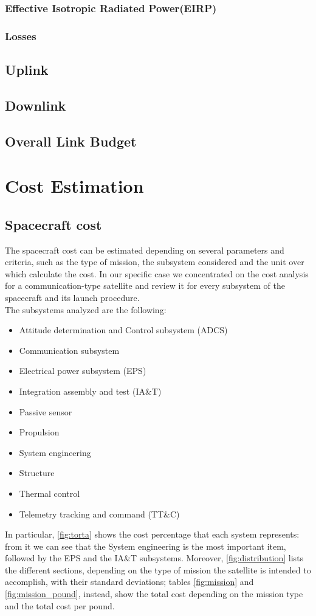 \documentclass[11pt,a4paper,titlepage]{article}
\begin{document}
		\subsubsection{Effective Isotropic Radiated Power(EIRP)}
		\subsubsection{Losses}
	\subsection{Uplink}
	\subsection{Downlink}
	\subsection{Overall Link Budget}
\lipsum[1]

\section{Cost Estimation}
	\subsection{Spacecraft cost}
		The spacecraft cost can be estimated depending on several parameters and criteria, such as the type of mission, the 				subsystem considered and the unit over which calculate the cost. In our specific case we concentrated on the cost analysis 		for a communication-type satellite and review it for every subsystem of the spacecraft and its launch procedure.\\
		
		The subsystems analyzed  are the following:
		\begin{itemize}
			\item Attitude determination and Control subsystem (ADCS)
			\item Communication subsystem
			\item Electrical power subsystem (EPS)
			\item Integration assembly and test (IA\&T)
			\item Passive sensor
			\item Propulsion
			\item System engineering
			\item Structure
			\item Thermal control
			\item Telemetry tracking and command (TT\&C)
		\end{itemize}
		In particular, \autoref{fig:torta} shows the cost percentage that each system represents: from it we can see that the 				System engineering is the most important item, followed by the EPS and the IA\&T subsystems. Moreover, 						\autoref{fig:distribution} lists the different sections, depending on the type of mission the satellite is intended to 					accomplish, with their standard deviations; tables \ref{fig:mission} and \ref{fig:mission_pound}, instead, show the total 			cost depending on the mission type and the total cost per pound.
		
\end{document}
